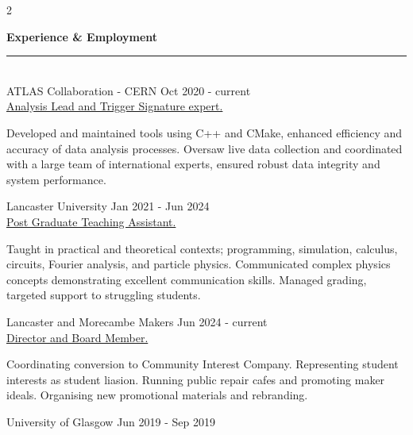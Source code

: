 \documentclass[10pt]{article}
\begin{document}
    \vspace{-10pt}
    \begin{multicols*}{2}
    \begin{description}[leftmargin=6pt]
        \item \Large{\textbf{\textcolor{dt}{Experience \& Employment}}\vspace{-8pt} \textcolor{dt}{\rule{0.5\textwidth-10pt}{1pt}}}\normalsize\\\vspace{5pt}  
            {\firamedium ATLAS Collaboration - CERN } \hfill Oct 2020 - current \\
            \underline{Analysis Lead and Trigger Signature expert.} \vspace{-7pt}
            \begin{justify} \noindent Developed and maintained tools using C++ and CMake, enhanced efficiency and accuracy of data analysis processes. Oversaw live data collection and coordinated with a large team of international experts, ensured robust data integrity and system performance. \end{justify}
            \vspace{-3pt}
            {\firamedium Lancaster University } \hfill Jan 2021 - Jun 2024 \\
            \underline{Post Graduate Teaching Assistant.} \vspace{-7pt}
            \begin{justify} \noindent Taught in practical and theoretical contexts; programming, simulation, calculus, circuits, Fourier analysis, and particle physics. Communicated complex physics concepts demonstrating excellent communication skills. Managed grading, targeted support to struggling students.\end{justify}
            \vspace{-3pt}
            {\firamedium Lancaster and Morecambe Makers} \hfill Jun 2024 - current\\
            \underline{Director and Board Member.} \vspace{-7pt}
            \begin{justify} \noindent Coordinating conversion to Community Interest Company. Representing student interests as student liasion. Running public repair cafes and promoting maker ideals. Organising new promotional materials and rebranding.\end{justify} 
            \vspace{-3pt}
            {\firamedium University of Glasgow} \hfill Jun 2019 - Sep 2019\\ 

\end{description}
\end{multicols*}
\end{document}
